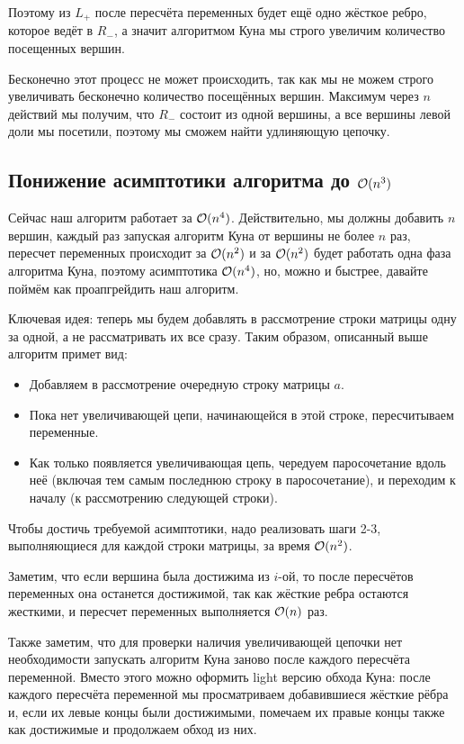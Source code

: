 Поэтому из $L_+$ после пересчёта переменных будет ещё одно жёсткое ребро, которое
ведёт в $R_-$, а значит алгоритмом Куна мы строго увеличим количество посещенных
вершин.

Бесконечно этот процесс не может происходить, так как мы не можем строго увеличивать
бесконечно количество посещённых вершин. Максимум через $n$ действий мы получим,
что $R_-$ состоит из одной вершины, а все вершины левой доли мы посетили, поэтому
мы сможем найти удлиняющую цепочку.

\subsection{Понижение асимптотики алгоритма до $\mathcal{O}(n^3)$}

Сейчас наш алгоритм работает за $\mathcal{O}(n^4)$. Действительно, мы должны добавить $n$
вершин, каждый раз запуская алгоритм Куна от вершины не более $n$ раз, пересчет
переменных происходит за $\mathcal{O}(n^2)$ и за $\mathcal{O}(n^2)$ будет работать одна фаза алгоритма
Куна, поэтому асимптотика $\mathcal{O}(n^4)$, но, можно и быстрее, давайте поймём как
проапгрейдить наш алгоритм. 

Ключевая идея: теперь мы будем добавлять в рассмотрение строки матрицы одну за 
одной, а не рассматривать их все сразу. Таким образом, описанный выше алгоритм примет вид:

\begin{itemize}
  \item Добавляем в рассмотрение очередную строку матрицы $a$.
  \item Пока нет увеличивающей цепи, начинающейся в этой строке, пересчитываем переменные.
  \item Как только появляется увеличивающая цепь, чередуем паросочетание вдоль неё 
  (включая тем самым последнюю строку в паросочетание), и переходим к началу 
  (к рассмотрению следующей строки).
\end{itemize}

Чтобы достичь требуемой асимптотики, надо реализовать шаги 2-3, выполняющиеся 
для каждой строки матрицы, за время $\mathcal{O}(n^2)$.

Заметим, что если вершина была достижима из $i$-ой, то после пересчётов переменных она
останется достижимой, так как жёсткие ребра остаются жесткими, и пересчет
переменных выполняется $\mathcal{O}(n)$ раз.

Также заметим, что 
для проверки наличия увеличивающей цепочки нет необходимости запускать алгоритм
Куна заново после каждого пересчёта переменной. 
Вместо этого можно оформить light версию обхода Куна: после каждого 
пересчёта переменной мы просматриваем добавившиеся жёсткие рёбра и, если их 
левые концы были достижимыми, помечаем их правые концы также как достижимые и 
продолжаем обход из них.

